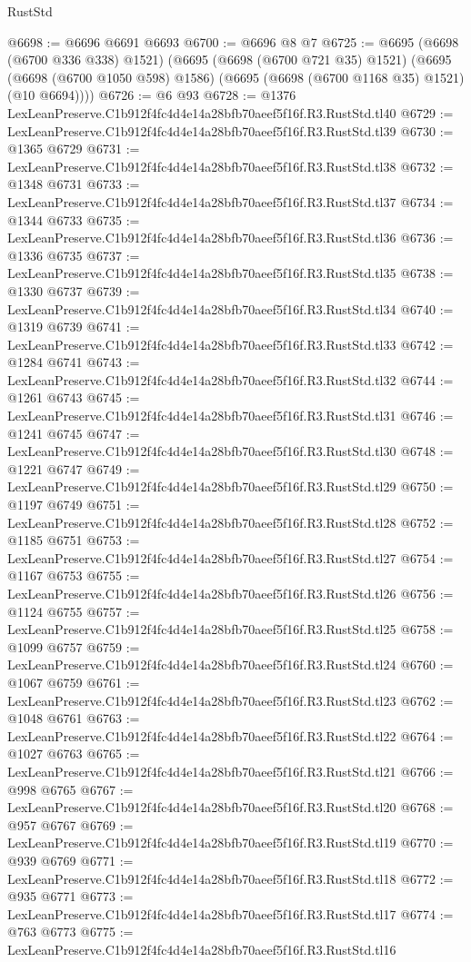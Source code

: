 \begin{lexlean}{RustStd}
\begin{coremodule}
@6698 := @6696 @6691 @6693
@6700 := @6696 @8 @7
@6725 := @6695
    (@6698 (@6700 @336 @338) @1521)
    (@6695
      (@6698 (@6700 @721 @35) @1521)
      (@6695 (@6698 (@6700 @1050 @598) @1586) (@6695 (@6698 (@6700 @1168 @35) @1521) (@10 @6694))))
@6726 := @6 @93
@6728 := @1376 LexLeanPreserve.C1b912f4fc4d4e14a28bfb70aeef5f16f.R3.RustStd.tl40
@6729 := LexLeanPreserve.C1b912f4fc4d4e14a28bfb70aeef5f16f.R3.RustStd.tl39
@6730 := @1365 @6729
@6731 := LexLeanPreserve.C1b912f4fc4d4e14a28bfb70aeef5f16f.R3.RustStd.tl38
@6732 := @1348 @6731
@6733 := LexLeanPreserve.C1b912f4fc4d4e14a28bfb70aeef5f16f.R3.RustStd.tl37
@6734 := @1344 @6733
@6735 := LexLeanPreserve.C1b912f4fc4d4e14a28bfb70aeef5f16f.R3.RustStd.tl36
@6736 := @1336 @6735
@6737 := LexLeanPreserve.C1b912f4fc4d4e14a28bfb70aeef5f16f.R3.RustStd.tl35
@6738 := @1330 @6737
@6739 := LexLeanPreserve.C1b912f4fc4d4e14a28bfb70aeef5f16f.R3.RustStd.tl34
@6740 := @1319 @6739
@6741 := LexLeanPreserve.C1b912f4fc4d4e14a28bfb70aeef5f16f.R3.RustStd.tl33
@6742 := @1284 @6741
@6743 := LexLeanPreserve.C1b912f4fc4d4e14a28bfb70aeef5f16f.R3.RustStd.tl32
@6744 := @1261 @6743
@6745 := LexLeanPreserve.C1b912f4fc4d4e14a28bfb70aeef5f16f.R3.RustStd.tl31
@6746 := @1241 @6745
@6747 := LexLeanPreserve.C1b912f4fc4d4e14a28bfb70aeef5f16f.R3.RustStd.tl30
@6748 := @1221 @6747
@6749 := LexLeanPreserve.C1b912f4fc4d4e14a28bfb70aeef5f16f.R3.RustStd.tl29
@6750 := @1197 @6749
@6751 := LexLeanPreserve.C1b912f4fc4d4e14a28bfb70aeef5f16f.R3.RustStd.tl28
@6752 := @1185 @6751
@6753 := LexLeanPreserve.C1b912f4fc4d4e14a28bfb70aeef5f16f.R3.RustStd.tl27
@6754 := @1167 @6753
@6755 := LexLeanPreserve.C1b912f4fc4d4e14a28bfb70aeef5f16f.R3.RustStd.tl26
@6756 := @1124 @6755
@6757 := LexLeanPreserve.C1b912f4fc4d4e14a28bfb70aeef5f16f.R3.RustStd.tl25
@6758 := @1099 @6757
@6759 := LexLeanPreserve.C1b912f4fc4d4e14a28bfb70aeef5f16f.R3.RustStd.tl24
@6760 := @1067 @6759
@6761 := LexLeanPreserve.C1b912f4fc4d4e14a28bfb70aeef5f16f.R3.RustStd.tl23
@6762 := @1048 @6761
@6763 := LexLeanPreserve.C1b912f4fc4d4e14a28bfb70aeef5f16f.R3.RustStd.tl22
@6764 := @1027 @6763
@6765 := LexLeanPreserve.C1b912f4fc4d4e14a28bfb70aeef5f16f.R3.RustStd.tl21
@6766 := @998 @6765
@6767 := LexLeanPreserve.C1b912f4fc4d4e14a28bfb70aeef5f16f.R3.RustStd.tl20
@6768 := @957 @6767
@6769 := LexLeanPreserve.C1b912f4fc4d4e14a28bfb70aeef5f16f.R3.RustStd.tl19
@6770 := @939 @6769
@6771 := LexLeanPreserve.C1b912f4fc4d4e14a28bfb70aeef5f16f.R3.RustStd.tl18
@6772 := @935 @6771
@6773 := LexLeanPreserve.C1b912f4fc4d4e14a28bfb70aeef5f16f.R3.RustStd.tl17
@6774 := @763 @6773
@6775 := LexLeanPreserve.C1b912f4fc4d4e14a28bfb70aeef5f16f.R3.RustStd.tl16

\end{coremodule}
\end{lexlean}
